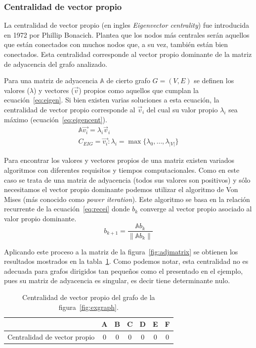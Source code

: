 \subsubsection{Centralidad de vector propio}
La centralidad de vector propio (en ingles \emph{Eigenvector centrality}) fue
introducida en 1972 por Phillip Bonacich\cite{bonacich1972factoring}.
Plantea que los nodos más centrales serán aquellos que están conectados con
muchos nodos que, a su vez, también están bien conectados.
Esta centralidad corresponde al vector propio dominante de la matriz de
adyacencia del grafo analizado. 

Para una matriz de adyacencia $\mathbb{A}$ de cierto grafo $G=(V,E)$ se definen 
los valores ($\lambda$) y vectores ($\vec{v}$) propios como aquellos que 
cumplan la ecuación~\ref{eq:eigen}.
Si bien existen varias soluciones a esta ecuación, la centralidad de vector
propio corresponde al $\vec{v}_i$ del cual su valor propio $\lambda_i$ sea
máximo (ecuación~\ref{eq:eigencent}). 
\begin{gather}
  \label{eq:eigen}
  \mathbb{A}\vec{v_i} = \lambda_i\vec{v}_i \\
  \label{eq:eigencent}
  C_{EIG} = \vec{v_i} : \lambda_i = \max{\{\lambda_0,\dots,\lambda_{|V|}\}}
\end{gather}

Para encontrar los valores y vectores propios de una matriz existen variados
algoritmos con diferentes requisitos y tiempos computacionales. Como en este
caso se trata de una matriz de adyacencia (todos sus valores son positivos) y
sólo necesitamos el vector propio dominante podemos utilizar el algoritmo de
Von Mises\cite{mises1929praktische} (más conocido como \emph{power iteration}).
Este algoritmo se basa en la relación recurrente de la ecuación~\ref{eq:recei}
donde $b_k$ converge al vector propio asociado al valor propio dominante.
\begin{equation}
  \label{eq:recei}
  b_{k+1} = \frac{\mathbb{A}b_k}{\lVert\mathbb{A}b_k\rVert}
\end{equation}

Aplicando este proceso a la matriz de la figura~\ref{fig:adjmatrix} se obtienen
los resultados mostrados en la tabla~\ref{tab:exeigen}. Como podemos notar, esta
centralidad no es adecuada para grafos dirigidos tan pequeños como el presentado
en el ejemplo, pues su matriz de adyacencia es singular, es decir tiene
determinante nulo.
\begin{table}[htpb]
  \centering
  \begin{tabular}{|l|c|c|c|c|c|c|}
    \hline         &  A  &  B  &  C  &  D  &  E  &  F  \\\hline
    Centralidad de vector propio & $0$ & $0$ & $0$ & $0$ & $0$ & $0$ \\\hline
  \end{tabular}
  \caption{Centralidad de vector propio del grafo de la
    figura~\ref{fig:exgraph}.}
  \label{tab:exeigen}
\end{table}

